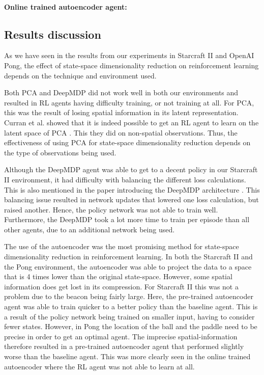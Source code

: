 \paragraph{Online trained autoencoder agent:}%

\subsection{Results discussion}\label{research-discussion}
As we have seen in the results from our experiments in Starcraft II and OpenAI Pong, the effect of state-space dimensionality reduction on reinforcement learning depends on the technique and environment used. 

Both PCA and DeepMDP did not work well in both our environments and resulted in RL agents having difficulty training, or not training at all. For PCA, this was the result of losing spatial information in its latent representation. Curran et al. showed that it is indeed possible to get an RL agent to learn on the latent space of PCA \cite{mario}. This they did on non-spatial observations. Thus, the effectiveness of using PCA for state-space dimensionality reduction depends on the type of observations being used.

Although the DeepMDP agent was able to get to a decent policy in our Starcraft II environment, it had difficulty with balancing the different loss calculations. This is also mentioned in the paper introducing the DeepMDP architecture \cite{deepmdp}. This balancing issue resulted in network updates that lowered one loss calculation, but raised another. Hence, the policy network was not able to train well. Furthermore, the DeepMDP took a lot more time to train per episode than all other agents, due to an additional network being used.

The use of the autoencoder was the most promising method for state-space dimensionality reduction in reinforcement learning. In both the Starcraft II and the Pong environment, the autoencoder was able to project the data to a space that is 4 times lower than the original state-space. However, some spatial information does get lost in its compression. For Starcraft II this was not a problem due to the beacon being fairly large. Here, the pre-trained autoencoder agent was able to train quicker to a better policy than the baseline agent. This is a result of the policy network being trained on smaller input, having to consider fewer states. However, in Pong the location of the ball and the paddle need to be precise in order to get an optimal agent. The imprecise spatial-information therefore resulted in a pre-trained autoencoder agent that performed slightly worse than the baseline agent. This was more clearly seen in the online trained autoencoder where the RL agent was not able to learn at all.